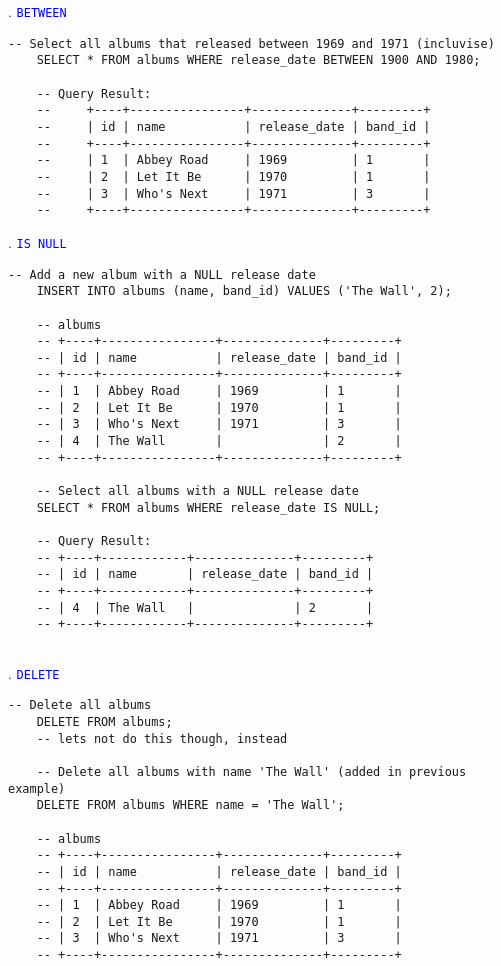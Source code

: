 . \textcolor{blue}{\texttt{BETWEEN}}
\begin{lstlisting}[style=sql]
    -- Select all albums that released between 1969 and 1971 (incluvise)
    SELECT * FROM albums WHERE release_date BETWEEN 1900 AND 1980;

    -- Query Result:
    --     +----+----------------+--------------+---------+
    --     | id | name           | release_date | band_id |
    --     +----+----------------+--------------+---------+
    --     | 1  | Abbey Road     | 1969         | 1       |
    --     | 2  | Let It Be      | 1970         | 1       |
    --     | 3  | Who's Next     | 1971         | 3       |
    --     +----+----------------+--------------+---------+

\end{lstlisting}

. \textcolor{blue}{\texttt{IS NULL}}

\begin{lstlisting}[style=sql]
    -- Add a new album with a NULL release date
    INSERT INTO albums (name, band_id) VALUES ('The Wall', 2);

    -- albums
    -- +----+----------------+--------------+---------+
    -- | id | name           | release_date | band_id |
    -- +----+----------------+--------------+---------+
    -- | 1  | Abbey Road     | 1969         | 1       |
    -- | 2  | Let It Be      | 1970         | 1       |
    -- | 3  | Who's Next     | 1971         | 3       |
    -- | 4  | The Wall       |              | 2       |
    -- +----+----------------+--------------+---------+

    -- Select all albums with a NULL release date
    SELECT * FROM albums WHERE release_date IS NULL;

    -- Query Result:
    -- +----+------------+--------------+---------+
    -- | id | name       | release_date | band_id |
    -- +----+------------+--------------+---------+
    -- | 4  | The Wall   |              | 2       |
    -- +----+------------+--------------+---------+
    
\end{lstlisting}

\newpage

. \textcolor{blue}{\texttt{DELETE}}

\begin{lstlisting}[style=sql]
    -- Delete all albums
    DELETE FROM albums;
    -- lets not do this though, instead

    -- Delete all albums with name 'The Wall' (added in previous example)
    DELETE FROM albums WHERE name = 'The Wall';

    -- albums
    -- +----+----------------+--------------+---------+
    -- | id | name           | release_date | band_id |
    -- +----+----------------+--------------+---------+
    -- | 1  | Abbey Road     | 1969         | 1       |
    -- | 2  | Let It Be      | 1970         | 1       |
    -- | 3  | Who's Next     | 1971         | 3       |
    -- +----+----------------+--------------+---------+

\end{lstlisting}